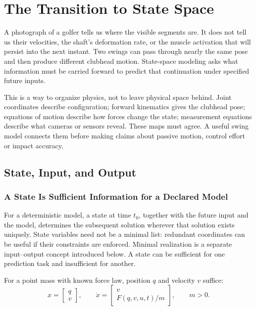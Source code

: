 \chapter{The Transition to State Space}
\label{ch:state_space}

A photograph of a golfer tells us where the visible segments are. It does not tell us their velocities, the shaft's deformation rate, or the muscle activation that will persist into the next instant. Two swings can pass through nearly the same pose and then produce different clubhead motion. State-space modeling asks what information must be carried forward to predict that continuation under specified future inputs.

This is a way to organize physics, not to leave physical space behind. Joint coordinates describe configuration; forward kinematics gives the clubhead pose; equations of motion describe how forces change the state; measurement equations describe what cameras or sensors reveal. These maps must agree. A useful swing model connects them before making claims about passive motion, control effort or impact accuracy.

\section{State, Input, and Output}
\label{sec:state_vector}
\label{def:statevector}
\label{laymans:context_box}

\subsection{A State Is Sufficient Information for a Declared Model}

For a deterministic model, a state at time $t_0$, together with the future input and the model, determines the subsequent solution wherever that solution exists uniquely. State variables need not be a minimal list: redundant coordinates can be useful if their constraints are enforced. Minimal realization is a separate input--output concept introduced below. A state can be sufficient for one prediction task and insufficient for another.

For a point mass with known force law, position $q$ and velocity $v$ suffice:
\begin{equation}
\label{eq:state_pair}
 x=\begin{bmatrix}q\\v\end{bmatrix},\qquad
 \dot x=\begin{bmatrix}v\\F(q,v,u,t)/m\end{bmatrix},\qquad m>0.
\end{equation}

